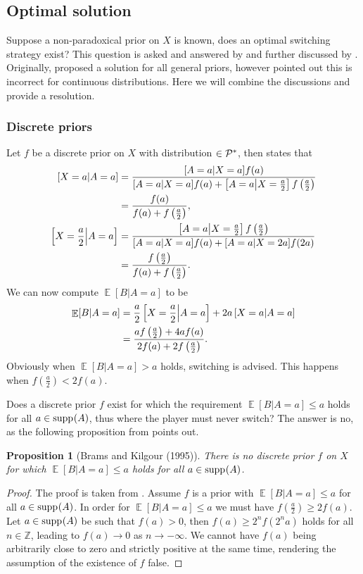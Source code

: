 \documentclass[a4paper]{report}
\theoremstyle{plain}
\newtheorem{proposition}[theorem]{Proposition}
\theoremstyle{definition}
\theoremstyle{remark}
\numberwithin{equation}{chapter}
\newcommand{\Z}{\mathbb{Z}}
\let\P\relax
\DeclareMathOperator{\P}{\mathbb{P}}
\DeclareMathOperator{\E}{\mathbb{E}}
\DeclareMathOperator{\1}{\mathbbm{1}}
\DeclareMathOperator{\supp}{supp}
\newcommand{\Pmod}{\mathcal{P}^*}
\begin{document}
\subsection{Optimal solution}
Suppose a non-paradoxical prior on $X$ is known, does an optimal switching strategy exist? This question is asked and answered by \cite{Christensen92} and further discussed by \cite{Christensen93a,Christensen93b,Christensen94,Christensen96}. Originally, \cite{Christensen92} proposed a solution for all general priors, however \cite{Christensen96} pointed out this is incorrect for continuous distributions. Here we will combine the discussions and provide a resolution.

\subsubsection{Discrete priors}
Let $f$ be a discrete prior on $X$ with distribution $\P\in\Pmod$, then \cite{Christensen92} states that
\begin{align}
\P\left[X=a\middle|A=a\right]&=\frac{\P[A=a|X=a]f(a)}{\P[A=a|X=a]f(a)+\P\left[A=a\middle|X=\frac{a}{2}\right]f\left(\frac{a}{2}\right)}\\
&=\frac{f(a)}{f(a)+f\left(\frac{a}{2}\right)},\\
\P\left[X=\frac{a}{2}\middle|A=a\right]&=\frac{\P\left[A=a\middle|X=\frac{a}{2}\right]f\left(\frac{a}{2}\right)}{\P[A=a|X=a]f(a)+\P[A=a|X=2a]f(2a)}\\
&=\frac{f\left(\frac{a}{2}\right)}{f(a)+f\left(\frac{a}{2}\right)}.
\end{align}
We can now compute $\E[B|A=a]$ to be
\begin{align}
\E[B|A=a]&=\frac{a}{2}\P\left[X=\frac{a}{2}\middle|A=a\right]+2a\P\left[X=a\middle|A=a\right]\\
&=\frac{af\left(\frac{a}{2}\right)+4af(a)}{2f(a)+2f\left(\frac{a}{2}\right)}.
\end{align}
Obviously when $\E[B|A=a]>a$ holds, switching is advised. This happens when $f\left(\frac{a}{2}\right)<2f(a)$.

Does a discrete prior $f$ exist for which the requirement $\E[B|A=a]\leq a$ holds for all $a\in\supp_{\P}(A)$, thus where the player must never switch? The answer is no, as the following proposition from \cite{Brams95} points out.
\begin{proposition}[Brams and Kilgour (1995)]
There is no discrete prior $f$ on $X$ for which $\E[B|A=a]\leq a$ holds for all $a\in\supp_{\P}(A)$.
\end{proposition}
\begin{proof}
The proof is taken from \cite{Brams95}. Assume $f$ is a prior with $\E[B|A=a]\leq a$ for all $a\in\supp_{\P}(A)$. In order for $\E[B|A=a]\leq a$ we must have $f\left(\frac{a}{2}\right)\geq2f(a)$. Let $a\in\supp_{\P}(A)$ be such that $f(a)>0$, then $f\left(a\right)\geq 2^{n}f(2^na)$ holds for all $n\in\Z$, leading to $f(a)\to0$ as $n\to-\infty$. We cannot have $f(a)$ being arbitrarily close to zero and strictly positive at the same time, rendering the assumption of the existence of $f$ false.
\end{proof}
\end{document}

